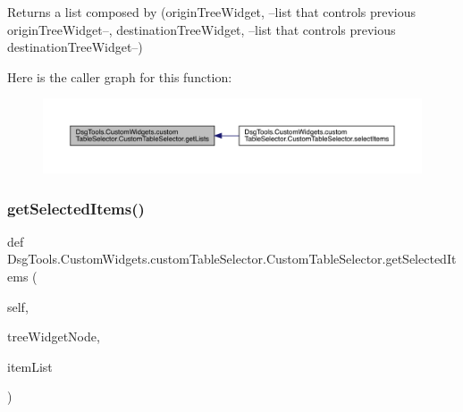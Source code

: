 \begin{DoxyVerb}Returns a list composed by (originTreeWidget, --list that controls previous originTreeWidget--, destinationTreeWidget, --list that controls previous destinationTreeWidget--)
\end{DoxyVerb}
 Here is the caller graph for this function\+:
\nopagebreak
\begin{figure}[H]
\begin{center}
\leavevmode
\includegraphics[width=350pt]{class_dsg_tools_1_1_custom_widgets_1_1custom_table_selector_1_1_custom_table_selector_a1bd2f667614af00a55c8f4c00d4934a3_icgraph}
\end{center}
\end{figure}
\mbox{\label{class_dsg_tools_1_1_custom_widgets_1_1custom_table_selector_1_1_custom_table_selector_ad9f3c101290cad906f084c6568afedf5}} 
\subsubsection{\texorpdfstring{get\+Selected\+Items()}{getSelectedItems()}}
{\footnotesize\ttfamily def Dsg\+Tools.\+Custom\+Widgets.\+custom\+Table\+Selector.\+Custom\+Table\+Selector.\+get\+Selected\+Items (\begin{DoxyParamCaption}\item[{}]{self,  }\item[{}]{tree\+Widget\+Node,  }\item[{}]{item\+List }\end{DoxyParamCaption})}


